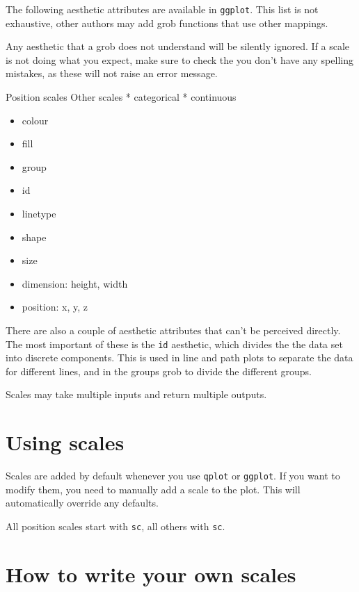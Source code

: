 The following aesthetic attributes are available in {\tt ggplot}.  This list is not exhaustive, other authors may add grob functions that use other mappings.  

Any aesthetic that a grob does not understand will be silently ignored.  If a scale is not doing what you expect, make sure to check the you don't have any spelling mistakes, as these will not raise an error message.

Position scales
Other scales
 * categorical
 * continuous

\begin{itemize}
	\item colour
	\item fill
	\item group
	\item id
	\item linetype
	\item shape
	\item size
	\item dimension: height, width
	\item position: x, y, z
\end{itemize}

There are also a couple of aesthetic attributes that can't be perceived directly.  The most important of these is the {\tt id} aesthetic, which divides the the data set into discrete components.   This is used in line and path plots to separate the data for different lines, and in the groups grob to divide the different groups. 

Scales may take multiple inputs and return multiple outputs.

\section{Using scales}\label{sec:using_scales}

Scales are added by default whenever you use {\tt qplot} or {\tt ggplot}.  If you want to modify them, you need to manually add a scale to the plot.  This will automatically override any defaults.


All position scales start with {\tt sc}, all others with {\tt sc}.

\section{How to write your own scales}\label{sec:how_to_write_your_own_scales}



